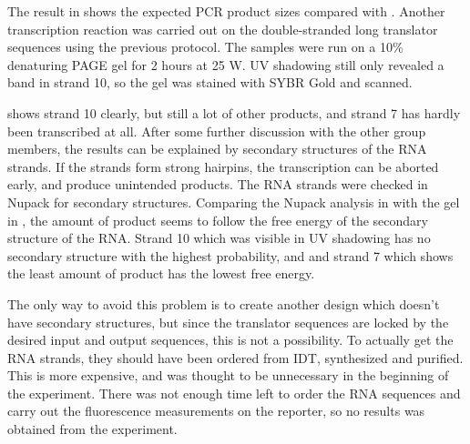 The result in  shows the expected PCR product sizes compared with . Another transcription reaction was carried out on the double-stranded long translator sequences using the previous protocol. The samples were run on a 10\% denaturing PAGE gel for 2 hours at 25 W. UV shadowing still only revealed a band in strand 10, so the gel was stained with SYBR Gold and scanned.

 shows strand 10 clearly, but still a lot of other products, and strand 7 has hardly been transcribed at all. After some further discussion with the other group members, the results can be explained by secondary structures of the RNA strands. If the strands form strong hairpins, the transcription can be aborted early, and produce unintended products. The RNA strands were checked in Nupack for secondary structures. Comparing the Nupack analysis in  with the gel in , the amount of product seems to follow the free energy of the secondary structure of the RNA. Strand 10 which was visible in UV shadowing has no secondary structure with the highest probability, and and strand 7 which shows the least amount of product has the lowest free energy.

The only way to avoid this problem is to create another design which doesn't have secondary structures, but since the translator sequences are locked by the desired input and output sequences, this is not a possibility. To actually get the RNA strands, they should have been ordered from IDT, synthesized and purified. This is more expensive, and was thought to be unnecessary in the beginning of the experiment. There was not enough time left to order the RNA sequences and carry out the fluorescence measurements on the reporter, so no results was obtained from the experiment.
